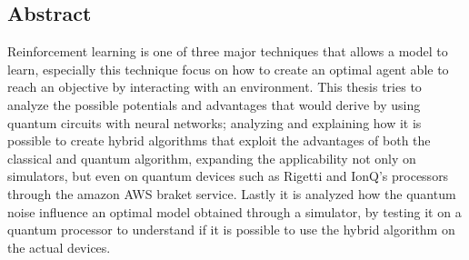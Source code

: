\begin{center}
	\section*{Abstract}
\end{center}
Reinforcement learning is one of three major techniques that allows a model to learn, especially this technique focus on how to create an optimal agent able to reach an objective by interacting with an environment. 
This thesis tries to analyze the possible potentials and advantages that would derive by using quantum circuits with neural networks; 
analyzing and explaining how it is possible to create hybrid algorithms that exploit the advantages of both the classical and quantum algorithm, expanding the applicability not only on simulators, but even on quantum devices such as Rigetti and IonQ's processors through the amazon AWS braket service. 
Lastly it is analyzed how the quantum noise influence an optimal model obtained through a simulator, by testing it on a quantum processor to understand if it is possible to use the hybrid algorithm on the actual devices.

